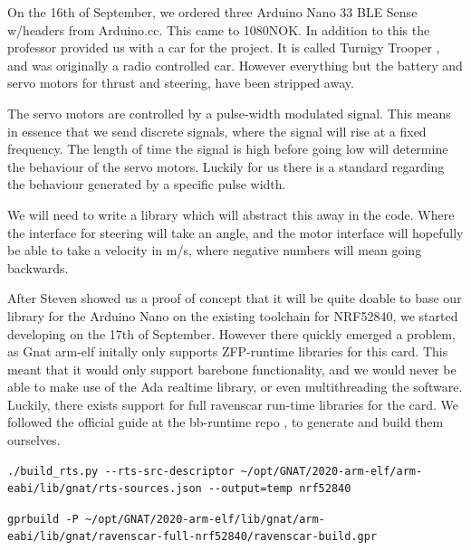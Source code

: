 \documentclass{article}
\begin{document}
On the 16th of September, we ordered three Arduino Nano 33 BLE Sense w/headers from Arduino.cc. This came to 1080NOK. In addition to this the professor provided us with a car for the project. It is called Turnigy Trooper \cite{CAR}, and was originally a radio controlled car. However everything but the battery and servo motors for thrust and steering, have been stripped away. 

The servo motors are controlled by a pulse-width modulated signal. This means in essence that we send discrete signals, where the signal will rise at a fixed frequency. The length of time the signal is high before going low will determine the behaviour of the servo motors. Luckily for us there is a standard regarding the behaviour generated by a specific pulse width. 

We will need to write a library which will abstract this away in the code. Where the interface for steering will take an angle, and the motor interface will hopefully be able to take a velocity in m/s, where negative numbers will mean going backwards.

\vspace{5mm}
After Steven showed us a proof of concept that it will be quite doable to base our library for the Arduino Nano on the existing toolchain for NRF52840, we started developing on the 17th of September. However there quickly emerged a problem, as Gnat arm-elf initally only supports ZFP-runtime libraries for this card. This meant that it would only support barebone functionality, and we would never be able to make use of the Ada realtime library, or even multithreading the software. Luckily, there exists support for full ravenscar run-time libraries for the card. We followed the official guide at the bb-runtime repo \cite{BBRUNTIMES}, to generate and build them ourselves.


\begin{lstlisting}
./build_rts.py --rts-src-descriptor ~/opt/GNAT/2020-arm-elf/arm-eabi/lib/gnat/rts-sources.json --output=temp nrf52840
\end{lstlisting}

\begin{lstlisting}
gprbuild -P ~/opt/GNAT/2020-arm-elf/lib/gnat/arm-eabi/lib/gnat/ravenscar-full-nrf52840/ravenscar-build.gpr
\end{lstlisting}
\end{document}
